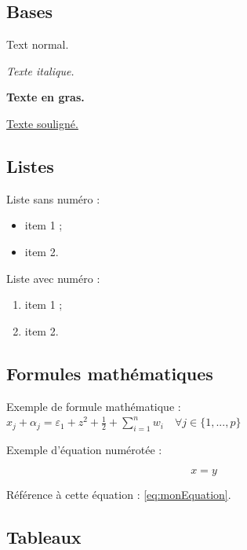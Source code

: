 \documentclass[12pt]{report}
\begin{document}
\subsection{Bases}

Text normal.

\textit{Texte italique.}

\textbf{Texte en gras.}

\underline{Texte souligné.}

\subsection{Listes}

Liste sans numéro :
\begin{itemize}
\item item 1 ;
\item item 2.
\end{itemize}

Liste avec numéro :
\begin{enumerate}
\item item 1 ;
\item item 2.
\end{enumerate}

\subsection{Formules mathématiques}

Exemple de formule mathématique :
$ x_j + \alpha_j = \varepsilon_1 + z^2 + \frac 1 2 + \sum_{i=1}^n w_i\quad \forall j\in\{1,
..., p\}$

Exemple d'équation numérotée :

\begin{equation}
x = y
  \label{eq:monEquation}
\end{equation}

Référence à cette équation : \eqref{eq:monEquation}.

\subsection{Tableaux}
\end{document}
